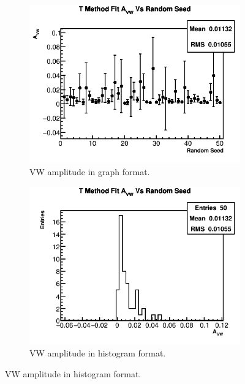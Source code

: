 	\begin{figure}[]
	\centering
	    \begin{subfigure}[t]{0.45\textwidth}
		    \centering
			\includegraphics[width=\textwidth]{TMethod_A_VW_Vs_Iter_Canv}
		    \caption{VW amplitude in graph format.}
	    \end{subfigure}
	    \hspace{4mm}
	    \begin{subfigure}[t]{0.45\textwidth}
		    \centering
			\includegraphics[width=\textwidth]{TMethod_A_VW_Vs_Iter_Canv_hist}
		    \caption{VW amplitude in histogram format.}
	    \end{subfigure}%

\end{figure}
